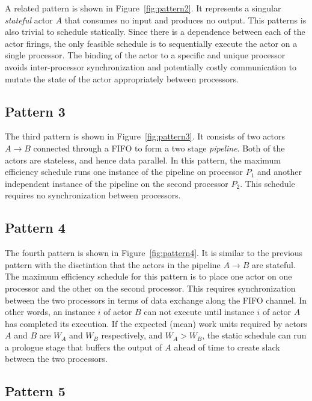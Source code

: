 A related pattern is shown in Figure~\ref{fig:pattern2}. It
represents a singular {\it stateful} actor $A$ that consumes no input
and produces no output.
This patterns is also trivial to schedule statically. Since there is a
dependence between each of the actor firings, the only feasible
schedule is to sequentially execute the actor on a single
processor. The binding of the actor to a specific and unique
processor avoids inter-processor synchronization and
potentially costly communication to mutate the state of the actor
appropriately between processors.

\subsection{Pattern 3}

The third pattern is shown in Figure~\ref{fig:pattern3}. It consists
of two actors $A\rightarrow B$ connected through a FIFO to form a two
stage {\it pipeline}. Both of the actors are stateless, and hence data
parallel. In this pattern, the maximum efficiency schedule runs one
instance of the pipeline on processor $P_1$ and another independent
instance of the pipeline on the second processor $P_2$.  This schedule
requires no synchronization between processors.

\subsection{Pattern 4}

The fourth pattern is shown in Figure~\ref{fig:pattern4}. It is
similar to the previous pattern with the disctintion that the actors
in the pipeline $A\rightarrow B$ are stateful. The maximum efficiency
schedule for this pattern is to place one actor on one processor and
the other on the second processor. This requires synchronization
between the two processors in terms of data exchange along the FIFO
channel. In other words, an instance $i$ of actor $B$ can not execute
until instance $i$ of actor $A$ has completed its execution.  If the
expected (mean) work units required by actors $A$ and $B$ are $W_A$
and $W_B$ respectively, and $W_A > W_B$, the static schedule can
run a prologue stage that buffers the output of $A$ ahead of time to
create slack between the two processors.

\subsection{Pattern 5}

